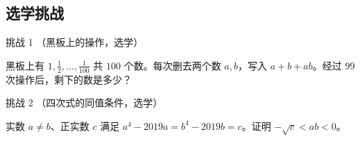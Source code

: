

\subsection{选学挑战}


\begin{problem}{挑战 1 \starred （黑板上的操作，选学）}

黑板上有 $1,\frac12,\ldots,\frac1{100}$ 共 $100$ 个数。每次删去两个数 $a,b$，写入 $a+b+ab$。经过 $99$ 次操作后，剩下的数是多少？

\end{problem}


\begin{problem}{挑战 2 \starred （四次式的同值条件，选学）}

实数 $a\ne b$、正实数 $c$ 满足 $a^4-2019a=b^4-2019b=c$。证明 $-\sqrt c<ab<0$。

\end{problem}
